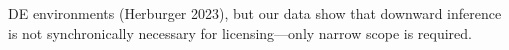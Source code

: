 \documentclass[12pt, a4]{article}
\begin{document}
DE environments (Herburger 2023), but our data show that downward inference is not synchronically necessary for licensing—only narrow scope is required.

\newpage



\end{document}
